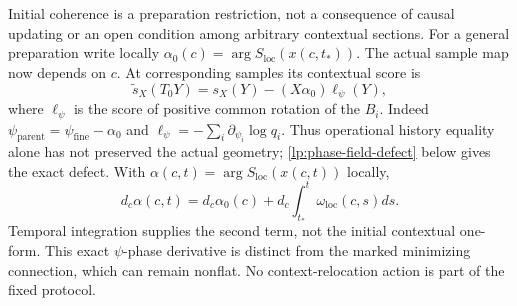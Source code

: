Initial coherence is a preparation restriction, not a consequence of causal updating or an open condition among arbitrary contextual sections. For a general preparation write locally $\alpha_0(c)=\arg S_{\mathrm{loc}}(x(c,t_*))$. The actual sample map now depends on $c$. At corresponding samples its contextual score is
\begin{equation}
 \widetilde s_X(T_0Y)=s_X(Y)-(X\alpha_0)\ell_\psi(Y),
 \label{lp:initial-phase-score-defect}
\end{equation}
where $\ell_\psi$ is the score of positive common rotation of the $B_i$. Indeed $\psi_{\mathrm{parent}}=\psi_{\mathrm{fine}}-\alpha_0$ and $\ell_\psi=-\sum_i\partial_{\psi_i}\log q_i$. Thus operational history equality alone has not preserved the actual geometry; \cref{lp:phase-field-defect} below gives the exact defect. With $\alpha(c,t)=\arg S_{\mathrm{loc}}(x(c,t))$ locally,
\begin{equation}
 d_c\alpha(c,t)=d_c\alpha_0(c)
 +d_c\int_{t_*}^{t}\omega_{\mathrm{loc}}(c,s)ds.
 \label{lp:initial-phase-datum}
\end{equation}
Temporal integration supplies the second term, not the initial contextual one-form. This exact $\psi$-phase derivative is distinct from the marked minimizing connection, which can remain nonflat. No context-relocation action is part of the fixed protocol.

